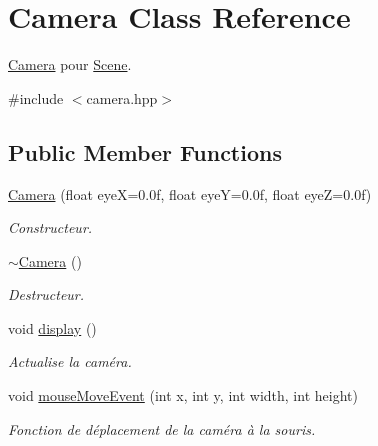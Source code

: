 \hypertarget{class_camera}{\section{Camera Class Reference}
\label{class_camera}
}


\hyperlink{class_camera}{Camera} pour \hyperlink{class_scene}{Scene}.  




{\ttfamily \#include $<$camera.\+hpp$>$}

\subsection*{Public Member Functions}
\begin{DoxyCompactItemize}
\item 
\hyperlink{class_camera_a415d689f1cf61b90da28f53dc232f232}{Camera} (float eye\+X=0.\+0f, float eye\+Y=0.\+0f, float eye\+Z=0.\+0f)
\begin{DoxyCompactList}\small\item\em Constructeur. \end{DoxyCompactList}\item 
\hyperlink{class_camera_ad1897942d0ccf91052386388a497349f}{$\sim$\+Camera} ()
\begin{DoxyCompactList}\small\item\em Destructeur. \end{DoxyCompactList}\item 
void \hyperlink{class_camera_adbfdac30f082ddea86183c1c31493946}{display} ()
\begin{DoxyCompactList}\small\item\em Actualise la caméra. \end{DoxyCompactList}\item 
void \hyperlink{class_camera_a22aaf20b581d402e5c3952655b830c0f}{mouse\+Move\+Event} (int x, int y, int width, int height)
\begin{DoxyCompactList}\small\item\em Fonction de déplacement de la caméra à la souris. \end{DoxyCompactList}\end{DoxyCompactItemize}
